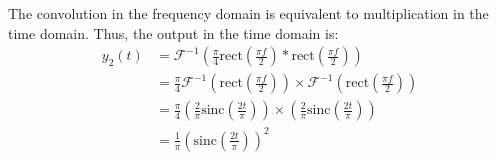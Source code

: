 \documentclass{article}
\begin{document}
\begin{enumerate}[label=2.\arabic*]
    The convolution in the frequency domain is equivalent to multiplication in the time domain. Thus, the output in the time domain is:
    \begin{align*}
        y_2(t) &= \mathcal{F}^{-1}\left(\frac{\pi}{4}\text{rect}\left(\frac{\pi f}{2}\right) \ast \text{rect}\left(\frac{\pi f}{2}\right)\right) \\
        &= \frac{\pi}{4} \mathcal{F}^{-1}\left(\text{rect}\left(\frac{\pi f}{2}\right)\right) \times \mathcal{F}^{-1}\left(\text{rect}\left(\frac{\pi f}{2}\right)\right) \\
        &= \frac{\pi}{4} \left(\frac{2}{\pi} \text{sinc}\left(\frac{2t}{\pi}\right)\right) \times \left(\frac{2}{\pi} \text{sinc}\left(\frac{2t}{\pi}\right)\right) \\
        &= \boxed{\frac{1}{\pi}\left(\text{sinc}\left(\frac{2t}{\pi}\right)\right)^2} \
    \end{align*}


\end{enumerate}
\end{document}
